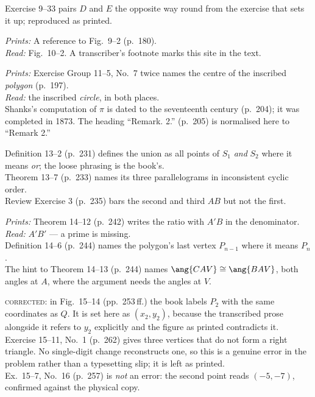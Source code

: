 \documentclass[11pt]{book}
\theoremstyle{bkplain}
\theoremstyle{XIplainnote}
\theoremstyle{bkplain}
\theoremstyle{bkplain}
\newcommand{\ERprints}[1]{\emph{Prints:} #1}
\newcommand{\ERmeans}[1]{\emph{Read:} #1}
\begin{document}
\begin{erratalist}
\item[Chapter 9 \quad Similarity of triangles and polygons]
Exercise 9--33 pairs $D$ and $E$ the opposite way round from the exercise
that sets it up; reproduced as printed.

\item[Chapter 10 \quad Area]
\ERprints{A reference to Fig.~9--2 (p.~180).}\\
\ERmeans{Fig.~10--2.} A transcriber's footnote marks this site in the text.

\item[Chapter 11 \quad Circles and regular polygons]
\ERprints{Exercise Group 11--5, No.~7 twice names the centre of the inscribed
\emph{polygon} (p.~197).}\\
\ERmeans{the inscribed \emph{circle}, in both places.}\\
Shanks's computation of $\pi$ is dated to the seventeenth century (p.~204);
it was completed in 1873. The heading ``Remark. 2.'' (p.~205) is normalised
here to ``Remark 2.''

\item[Chapter 13 \quad Loci and sets]
Definition 13--2 (p.~231) defines the union as all points of $S_1$
\emph{and} $S_2$ where it means \emph{or}; the loose phrasing is the book's.\\
Theorem 13--7 (p.~233) names its three parallelograms in inconsistent cyclic
order.\\
Review Exercise 3 (p.~235) bars the second and third $AB$ but not the first.

\item[Chapter 14 \quad Space geometry]
\ERprints{Theorem 14--12 (p.~242) writes the ratio with $A'B$ in the
denominator.}\\
\ERmeans{$A'B'$ --- a prime is missing.}\\
Definition 14--6 (p.~244) names the polygon's last vertex $P_{n-1}$ where it
means $P_n$.\\
The hint to Theorem 14--13 (p.~244) names $\ang{CAV} \cong \ang{BAV}$, both
angles at $A$, where the argument needs the angles at $V$.

\item[Chapter 15 \quad Analytic geometry]
\textsc{corrected}: in Fig.~15--14 (pp.~253\,ff.) the book labels $P_2$ with
the same coordinates as $Q$. It is set here as $(x_2, y_2)$, because the
transcribed prose alongside it refers to $y_2$ explicitly and the figure as
printed contradicts it.\\
Exercise 15--11, No.~1 (p.~262) gives three vertices that do not form a right
triangle. No single-digit change reconstructs one, so this is a genuine error
in the problem rather than a typesetting slip; it is left as printed.\\
Ex.~15--7, No.~16 (p.~257) is \emph{not} an error: the second point reads
$(-5, -7)$, confirmed against the physical copy.


\end{erratalist}
\end{document}
